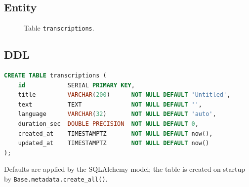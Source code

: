 \documentclass[11pt,a4paper]{article}
\begin{document}
\subsection{Entity}
\begin{figure}[H]
\centering
{}
\caption{Table \texttt{transcriptions}.}
\end{figure}

\subsection{DDL}
\begin{lstlisting}[language=SQL]
CREATE TABLE transcriptions (
    id            SERIAL PRIMARY KEY,
    title         VARCHAR(200)      NOT NULL DEFAULT 'Untitled',
    text          TEXT              NOT NULL DEFAULT '',
    language      VARCHAR(32)       NOT NULL DEFAULT 'auto',
    duration_sec  DOUBLE PRECISION  NOT NULL DEFAULT 0,
    created_at    TIMESTAMPTZ       NOT NULL DEFAULT now(),
    updated_at    TIMESTAMPTZ       NOT NULL DEFAULT now()
);
\end{lstlisting}
Defaults are applied by the SQLAlchemy model; the table is created on startup by
\texttt{Base.metadata.create\_all()}.
\end{document}
